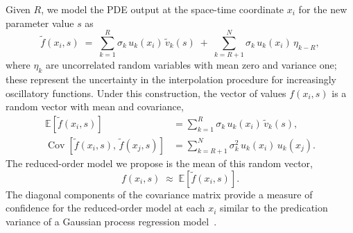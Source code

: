 \documentclass[final]{siamltex}
\begin{document}
Given $R$, we model the PDE output at the space-time coordinate $x_i$
for the new parameter value $s$ as
\begin{equation}
\label{eq:rommodel}
\tilde{f}(x_i,s) \;=\; 
\sum_{k=1}^R \sigma_k\,u_k(x_i)\,\tilde{v}_k(s)
\;+\;  \sum_{k=R+1}^N \sigma_k\,u_k(x_i)\,\eta_{k-R},
\end{equation}
where $\eta_k$ are uncorrelated random variables with mean zero and
variance one; these represent the uncertainty in the interpolation
procedure for increasingly oscillatory functions. Under this
construction, the vector of values $f(x_i,s)$ is a random vector with
mean and covariance,
\begin{equation}
\label{eq:meancovar}
\begin{aligned}
{\mathbb{E}\left[{\tilde{f}(x_i,s)}\right]} &= \sum_{k=1}^R
\sigma_k\,u_k(x_i)\,\tilde{v}_k(s), \\ 
{\operatorname{Cov}\left[{\tilde{f}(x_i,s)},\,{\tilde{f}(x_j,s)}\right]}
&= \sum_{k=R+1}^N \sigma_k^2\,u_k(x_i)\,u_k(x_j).
\end{aligned}
\end{equation}
The reduced-order model we propose is the mean of this random vector,
\begin{equation}
\label{eq:gpmean}
f(x_i,s) \;\approx\; {\mathbb{E}\left[{\tilde{f}(x_i,s)}\right]}.
\end{equation}
The diagonal components of the covariance matrix provide a measure of
confidence for the reduced-order model at each $x_i$ similar to the
predication variance of a Gaussian process regression
model~\cite{Rasmussen2006}.
\end{document}
